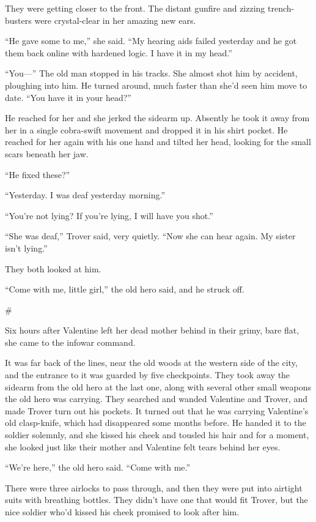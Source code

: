 They were getting closer to the front. The distant gunfire and
zizzing trench-busters were crystal-clear in her amazing new ears.

“He gave some to me,” she said. “My hearing aids failed yesterday
and he got them back online with hardened logic. I have it in my
head.”

“You—” The old man stopped in his tracks. She almost shot him by
accident, ploughing into him. He turned around, much faster than
she’d seen him move to date. “You have it in your head?”

He reached for her and she jerked the sidearm up. Absently he took
it away from her in a single cobra-swift movement and dropped it in
his shirt pocket. He reached for her again with his one hand and
tilted her head, looking for the small scars beneath her jaw.

“He fixed these?”

“Yesterday. I was deaf yesterday morning.”

“You’re not lying? If you’re lying, I will have you shot.”

“She was deaf,” Trover said, very quietly. “Now she can hear again.
My sister isn’t lying.”

They both looked at him.

“Come with me, little girl,” the old hero said, and he struck off.

\#

Six hours after Valentine left her dead mother behind in their
grimy, bare flat, she came to the infowar command.

It was far back of the lines, near the old woods at the western
side of the city, and the entrance to it was guarded by five
checkpoints. They took away the sidearm from the old hero at the
last one, along with several other small weapons the old hero was
carrying. They searched and wanded Valentine and Trover, and made
Trover turn out his pockets. It turned out that he was carrying
Valentine’s old clasp-knife, which had disappeared some months
before. He handed it to the soldier solemnly, and she kissed his
cheek and tousled his hair and for a moment, she looked just like
their mother and Valentine felt tears behind her eyes.

“We’re here,” the old hero said. “Come with me.”

There were three airlocks to pass through, and then they were put
into airtight suits with breathing bottles. They didn’t have one
that would fit Trover, but the nice soldier who’d kissed his cheek
promised to look after him.

